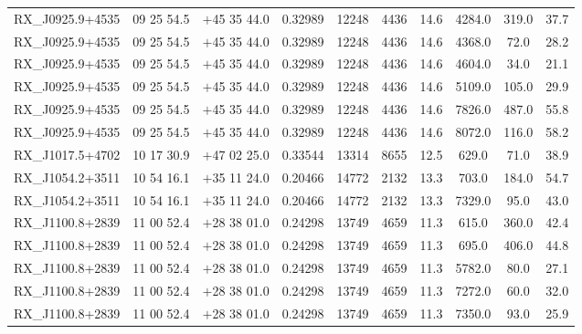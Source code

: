 \begin{landscape}
\begin{center}
\begin{longtable}{l c c c c c c c c c}
RX\_J0925.9+4535  &        09 25 54.5  &         $+$45 35 44.0  &       0.32989  & 12248  &   4436  &       14.6  &      4284.0  &  319.0  &  37.7  \\
RX\_J0925.9+4535  &        09 25 54.5  &         $+$45 35 44.0  &       0.32989  & 12248  &   4436  &       14.6  &      4368.0  &  72.0  &   28.2  \\
RX\_J0925.9+4535  &        09 25 54.5  &         $+$45 35 44.0  &       0.32989  & 12248  &   4436  &       14.6  &      4604.0  &  34.0  &   21.1  \\
RX\_J0925.9+4535  &        09 25 54.5  &         $+$45 35 44.0  &       0.32989  & 12248  &   4436  &       14.6  &      5109.0  &  105.0  &  29.9  \\
RX\_J0925.9+4535  &        09 25 54.5  &         $+$45 35 44.0  &       0.32989  & 12248  &   4436  &       14.6  &      7826.0  &  487.0  &  55.8  \\
RX\_J0925.9+4535  &        09 25 54.5  &         $+$45 35 44.0  &       0.32989  & 12248  &   4436  &       14.6  &      8072.0  &  116.0  &  58.2  \\
RX\_J1017.5+4702  &        10 17 30.9  &         $+$47 02 25.0  &       0.33544  & 13314  &   8655  &       12.5  &      629.0  &   71.0  &   38.9  \\
RX\_J1054.2+3511  &        10 54 16.1  &         $+$35 11 24.0  &       0.20466  & 14772  &   2132  &       13.3  &      703.0  &   184.0  &  54.7  \\
RX\_J1054.2+3511  &        10 54 16.1  &         $+$35 11 24.0  &       0.20466  & 14772  &   2132  &       13.3  &      7329.0  &  95.0  &   43.0  \\
RX\_J1100.8+2839  &        11 00 52.4  &         $+$28 38 01.0  &       0.24298  & 13749  &   4659  &       11.3  &      615.0  &   360.0  &  42.4  \\
RX\_J1100.8+2839  &        11 00 52.4  &         $+$28 38 01.0  &       0.24298  & 13749  &   4659  &       11.3  &      695.0  &   406.0  &  44.8  \\
RX\_J1100.8+2839  &        11 00 52.4  &         $+$28 38 01.0  &       0.24298  & 13749  &   4659  &       11.3  &      5782.0  &  80.0  &   27.1  \\
RX\_J1100.8+2839  &        11 00 52.4  &         $+$28 38 01.0  &       0.24298  & 13749  &   4659  &       11.3  &      7272.0  &  60.0  &   32.0  \\
RX\_J1100.8+2839  &        11 00 52.4  &         $+$28 38 01.0  &       0.24298  & 13749  &   4659  &       11.3  &      7350.0  &  93.0  &   25.9  \\

\end{longtable}
\end{center}
\end{landscape}
